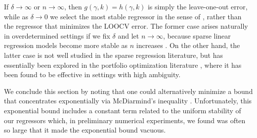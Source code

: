 \documentclass[opre,nonblindrev]{informs3} %
\begin{document}
 
If $\delta \rightarrow \infty$ or $n\to \infty$, then $g(\gamma,k)=h(\gamma,k)$ is simply the leave-one-out error, while as $\delta \rightarrow 0$ we select the most stable regressor in the sense of \citet{bousquet2002stability}, rather than the regressor that minimizes the LOOCV error. The former case arises naturally in overdetermined settings if we fix $\delta$ and let $n \rightarrow \infty$, because sparse linear regression models become more stable as $n$ increases \citep[see, e.g.,][]{bertsimas2020sparse, gamarnik2022sparse}. On the other hand, the latter case is not well studied in the sparse regression literature, but has essentially been explored in the portfolio optimization literature \citep[c.f.][]{demiguel2009portfolio}, where it has been found to be effective in settings with high ambiguity. 






We conclude this section by noting that one could %
alternatively minimize a bound that concentrates exponentially via McDiarmind's inequality \citep[Theorem 12]{bousquet2002stability}. Unfortunately, this exponential bound includes a constant term related to the uniform stability \citep[Definition 6]{bousquet2002stability} of our regressors which, in preliminary numerical experiments, we found was often so large that it made the exponential bound vacuous. 
\end{document}
